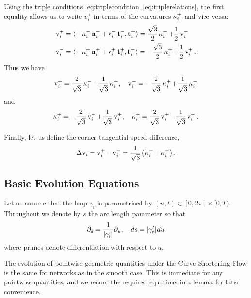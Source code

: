\documentclass[12pt]{amsart}
\begin{document}
Using the triple conditions \eqref{eq:triplecondition} \eqref{eq:triplerelations}, the first equality allows us to write \(v_i^{\pm}\) in terms of the curvatures \(\operatorname{\kappa}_i^{\pm}\) and vice-versa:
\begin{align*}
\operatorname{v}_i^+ &= \langle{-\operatorname{\kappa}_i^- \operatorname{\mathbf{n}}_i^- + \operatorname{v}_i^- \operatorname{\mathbf{t}}_i^-},{\operatorname{\mathbf{t}}_i^+}\rangle = \frac{\sqrt{3}}{2} \operatorname{\kappa}_i^- + \frac{1}{2} \operatorname{v}_i^- \\
\operatorname{v}_i^- &= \langle{-\operatorname{\kappa}_i^+ \operatorname{\mathbf{n}}_i^+ + \operatorname{v}_i^+ \operatorname{\mathbf{t}}_i^+},{\operatorname{\mathbf{t}}_i^-}\rangle = - \frac{\sqrt{3}}{2} \operatorname{\kappa}_i^+ + \frac{1}{2} \operatorname{v}_i^+.
\end{align*}
Thus we have
\begin{equation}
\label{eq:tangspeedcurvture}
\operatorname{v}_i^+ = \frac{2}{\sqrt{3}} \operatorname{\kappa}_i^- - \frac{1}{\sqrt{3}} \operatorname{\kappa}_i^+, \quad \operatorname{v}_i^- = -\frac{2}{\sqrt{3}} \operatorname{\kappa}_i^+ + \frac{1}{\sqrt{3}} \operatorname{\kappa}_i^-
\end{equation}
and
\begin{equation}
\label{eq:curvturetangentialspeed}
\operatorname{\kappa}_i^+ = -\frac{2}{\sqrt{3}} \operatorname{v}_i^- + \frac{1}{\sqrt{3}} \operatorname{v}_i^+, \quad \operatorname{\kappa}_i^- = \frac{2}{\sqrt{3}} \operatorname{v}_i^+ - \frac{1}{\sqrt{3}} \operatorname{v}_i^-.
\end{equation}

Finally, let us define the corner tangential speed difference,
\begin{equation}
\label{eq:cornerspeed}
\operatorname{{\Delta v}}_i = \operatorname{v}_i^+ - \operatorname{v}_i^- = \frac{1}{\sqrt{3}} \left(\operatorname{\kappa}_i^- + \operatorname{\kappa}_i^+\right).
\end{equation}

\subsection{Basic Evolution Equations}
\label{sec:orgheadline4}

Let us assume that the loop \(\gamma_t\) is parametrised by \((u, t) \in [0, 2\pi] \times [0, T)\). Throughout we denote by \(s\) the arc length parameter so that
\[
\partial_s = \frac{1}{\left|\gamma_t'\right|} \partial_u, \quad ds = \left|\gamma_t'\right| du
\]
where primes denote differentiation with respect to \(u\).

The evolution of pointwise geometric quantities under the Curve Shortening Flow is the same for networks as in the smooth case. This is immediate for any pointwise quantities, and we record the required equations in a lemma for later convenience.
\end{document}
